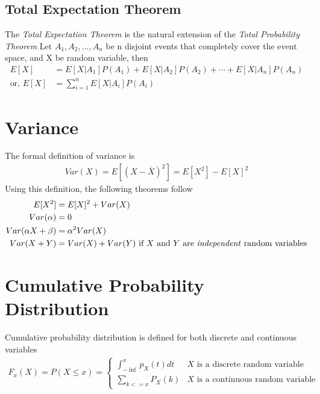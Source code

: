 \documentclass[../probability-notes.tex]{subfiles}
\begin{document}
    \subsection{Total Expectation Theorem}
    The \emph{Total Expectation Theorem} is the natural extension of the \emph{Total Probability Theorem}
    Let $A_{1}, A_{2}, \ldots, A_{n}$ be n disjoint events that completely cover the event space, and X be random variable, then
    \begin{align*}
        E[X] &= E[X|A_{1}]P(A_{1}) + E[X|A_{2}]P(A_{2}) + \cdots + E[X|A_{n}]P(A_{n})\\
        \text{or, } E[X] &= \sum_{i=1}^{n} E[X|A_{i}]P(A_{i})
    \end{align*}

    \section{Variance}
    The formal definition of variance is
    \begin{align*}
        Var(X) = E[(X - \bar{X})^{2}] = E[X^{2}] - E[X]^{2}
    \end{align*}
    Using this definition, the following theorems follow
    \begin{align*}
        E[X^{2}] &= E[X]^{2} + Var(X) \\
        Var(\alpha) &= 0 \\
        Var(\alpha X + \beta) &= \alpha^{2} Var(X) \\
        Var(X + Y) &= Var(X) + Var(Y) \text{  if $X$ and $Y$ are \emph{independent} random variables}
    \end{align*}

    \section{Cumulative Probability Distribution}
    Cumulative probability distribution is defined for both discrete and continuous variables
    \begin{align*}
        F_{x}(X) = P(X \leq x) = \begin{cases} \int_{-\inf}^{x} p_{X}(t) dt &\mbox{$X$ is a discrete random variable}\\
        \sum_{k <= x} P_{X}(k) &\mbox{$X$ is a continuous random variable} \end{cases}
    \end{align*}


\end{document}
